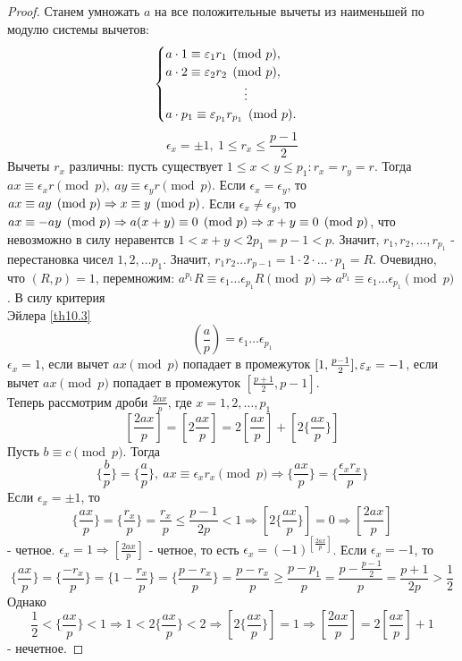     \begin{proof}
        Станем умножать $a$ на все положительные вычеты из наименьшей по модулю системы вычетов:\\
        \[\begin{cases}
            a\cdot 1\equiv \epsilon_1 r_1\pmod{p},\\
            a\cdot 2\equiv \epsilon_2 r_2\pmod{p},\\
            \tab[2.2cm]\vdots\\
            a\cdot p_1\equiv \epsilon_{p_1} r_{p_1}\pmod{p}.      
        \end{cases}\]
        \[\epsilon_x=\pm 1,\ 1\leq r_x\leq \frac{p-1}{2}\]
        Вычеты $r_x$ различны: пусть существует $1\leq x<y\leq p_1: r_x=r_y=r$. Тогда\\
        $ax\equiv \epsilon_xr\pmod{p},\ ay\equiv \epsilon_yr\pmod{p}$. Если $\epsilon_x=\epsilon_y$, то $ax\equiv ay\pmod{p}\\
        \Rightarrow x\equiv y\pmod{p}$. Если $\epsilon_x\ne \epsilon_y$, то $ax\equiv -ay \pmod{p}\\
        \Rightarrow a(x+y)\equiv 0\pmod{p} \Rightarrow x+y\equiv 0\pmod{p}$, что невозможно в силу неравентсв $1<x+y<2p_1=p-1<p$. Значит, $r_1,r_2,\dots, r_{p_1}$ - перестановка чисел $1,2,\dots p_1$. Значит, $r_1 r_2 \dots r_{p-1}=1\cdot 2\cdot \dots \cdot p_1=R$. Очевидно, что $(R,p)=1$, перемножим: $a^{p_1}R\equiv \epsilon_1\dots \epsilon_{p_1}R\pmod{p} \Rightarrow a^{p_1}\equiv \epsilon_1\dots\epsilon_{p_1}\pmod{p}$. В силу критерия \\
        Эйлера \eqref{th10.3}
        \[(\frac{a}{p})=\epsilon_1\dots\epsilon_{p_1}\]
        $\epsilon_x=1$, если вычет $ax\pmod{p}$ попадает в промежуток $[1,\frac{p-1}{2}],\\
        \epsilon_x=-1$, если вычет $ax\pmod{p}$ попадает в промежуток $[\frac{p+1}{2},p-1]$.\\
        Теперь рассмотрим дроби $\frac{2ax}{p}$, где $x=1,2,\dots, p_1$
        \[[\frac{2ax}{p}]=[2\frac{ax}{p}]=2[\frac{ax}{p}]+[2\{\frac{ax}{p}\}]\]
        Пусть $b\equiv c\pmod{p}$. Тогда 
        \[\{\frac{b}{p}\}=\{\frac{a}{p}\},\ ax\equiv \epsilon_x r_x\pmod{p} \Rightarrow \{\frac{ax}{p}\}=\{\frac{\epsilon_x r_x}{p}\}\]
        Если $\epsilon_x=\pm 1$, то 
        \[\{\frac{ax}{p}\}=\{\frac{r_x}{p}\}=\frac{r_x}{p}\leq \frac{p-1}{2p}<1 \Rightarrow [2\{\frac{ax}{p}\}]=0 \Rightarrow [\frac{2ax}{p}]\]
        - четное. $\epsilon_x=1 \Rightarrow [\frac{2ax}{p}]$ - четное, то есть $\epsilon_x=(-1)^{[\frac{2ax}{p}]}$.
        Если $\epsilon_x=-1$, то 
        \[\{\frac{ax}{p}\}=\{\frac{-r_x}{p}\}=\{1-\frac{r_x}{p}\}=\{\frac{p-r_x}{p}\}=\frac{p-r_x}{p}\geq \frac{p-p_1}{p}=\frac{p-\frac{p-1}{2}}{p}=\frac{p+1}{2p}>\frac{1}{2}\]
        Однако \[\frac{1}{2}<\{\frac{ax}{p}\}<1 \Rightarrow 1<2\{\frac{ax}{p}\}<2 \Rightarrow [2\{\frac{ax}{p}\}]=1 \Rightarrow [\frac{2ax}{p}]=2[\frac{ax}{p}]+1\]
        - нечетное.
    \end{proof} 
